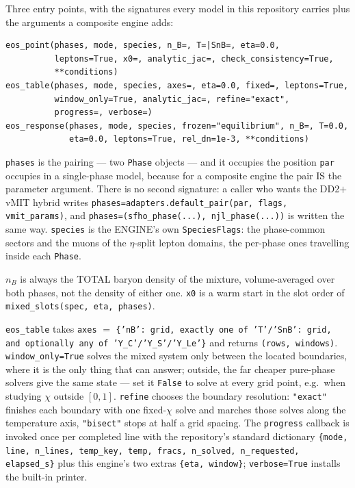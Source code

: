 \documentclass[aps,prc,onecolumn,superscriptaddress,nofootinbib,10pt]{revtex4-2}
\newcommand{\nB}{n_B}
\begin{document}
Three entry points, with the signatures every model in this repository carries
plus the arguments a composite engine adds:
%
\begin{verbatim}
eos_point(phases, mode, species, n_B=, T=|SnB=, eta=0.0,
          leptons=True, x0=, analytic_jac=, check_consistency=True,
          **conditions)
eos_table(phases, mode, species, axes=, eta=0.0, fixed=, leptons=True,
          window_only=True, analytic_jac=, refine="exact",
          progress=, verbose=)
eos_response(phases, mode, species, frozen="equilibrium", n_B=, T=0.0,
             eta=0.0, leptons=True, rel_dn=1e-3, **conditions)
\end{verbatim}
%
\texttt{phases} is the pairing --- two \texttt{Phase} objects --- and it
occupies the position \texttt{par} occupies in a single-phase model, because
for a composite engine the pair IS the parameter argument. There is no second
signature: a caller who wants the DD2$+$vMIT hybrid writes
\texttt{phases=adapters.default\_pair(par, flags, vmit\_params)}, and
\texttt{phases=(sfho\_phase(...), njl\_phase(...))} is written the same way.
\texttt{species} is the ENGINE's own \texttt{SpeciesFlags}: the phase-common
sectors and the muons of the $\eta$-split lepton domains, the per-phase ones
travelling inside each \texttt{Phase}.

$\nB$ is always the TOTAL baryon density of the mixture, volume-averaged over
both phases, not the density of either one. \texttt{x0} is a warm start in the
slot order of \texttt{mixed\_slots(spec, eta, phases)}.

\texttt{eos\_table} takes \texttt{axes} $=$ \texttt{\{'nB': grid, exactly one
of 'T'/'SnB': grid, and optionally any of 'Y\_C'/'Y\_S'/'Y\_Le'\}} and returns
\texttt{(rows, windows)}. \texttt{window\_only=True} solves the mixed system
only between the located boundaries, where it is the only thing that can
answer; outside, the far cheaper pure-phase solvers give the same state --- set
it \texttt{False} to solve at every grid point, e.g.\ when studying $\chi$
outside $[0,1]$. \texttt{refine} chooses the boundary resolution:
\texttt{"exact"} finishes each boundary with one fixed-$\chi$ solve and marches
those solves along the temperature axis, \texttt{"bisect"} stops at half a grid
spacing. The \texttt{progress} callback is invoked once per completed line with
the repository's standard dictionary \texttt{\{mode, line, n\_lines, temp\_key,
temp, fracs, n\_solved, n\_requested, elapsed\_s\}} plus this engine's two
extras \texttt{\{eta, window\}}; \texttt{verbose=True} installs the built-in
printer.
\end{document}
